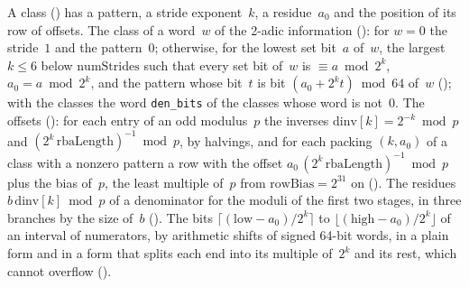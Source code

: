 \begin{definition}\label{def:packing}
  \leanok
  A class () has a pattern, a stride exponent~$k$, a
  residue~$a_0$ and the position of its row of offsets. The class of a word~$w$ of the 2-adic
  information (): for $w = 0$ the stride~$1$ and the pattern~$0$;
  otherwise, for the lowest set bit~$a$ of~$w$, the largest $k \le 6$ below $\mathrm{numStrides}$
  such that every set bit of~$w$ is $\equiv a \bmod 2^k$, $a_0 = a \bmod 2^k$, and the pattern whose
  bit~$t$ is bit $(a_0 + 2^k t) \bmod 64$ of~$w$ (); with the
  classes the word \verb|den_bits| of the classes whose word is not~$0$. The offsets
  (): for each entry of an odd modulus~$p$ the inverses
  $\mathrm{dinv}[k] = 2^{-k} \bmod p$ and $(2^k\,\mathrm{rbaLength})^{-1} \bmod p$, by halvings, and
  for each packing $(k, a_0)$ of a class with a nonzero pattern a row with the offset
  $a_0\,(2^k\,\mathrm{rbaLength})^{-1} \bmod p$ plus the bias of~$p$, the least multiple of~$p$ from
  $\mathrm{rowBias} = 2^{31}$ on (). The residues
  $b\,\mathrm{dinv}[k] \bmod p$ of a denominator for the moduli of the first two stages, in three
  branches by the size of~$b$ (). The bits
  $\lceil (\mathrm{low} - a_0)/2^k \rceil$ to $\lfloor (\mathrm{high} - a_0)/2^k \rfloor$ of an
  interval of numerators, by arithmetic shifts of signed 64-bit words, in a plain form and in a form
  that splits each end into its multiple of~$2^k$ and its rest, which cannot overflow
  ().
\end{definition}

